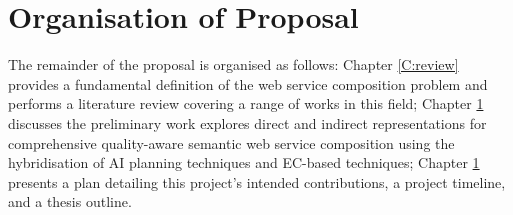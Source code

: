 \section{Organisation of Proposal}The remainder of the proposal is organised as follows: Chapter \ref{C:review} provides a fundamental definition of the web service composition problem and performs a literature review covering a range of works in this field; Chapter \ref{} discusses the preliminary work explores direct and indirect representations for comprehensive quality-aware semantic web service composition using the hybridisation of AI planning techniques and EC-based techniques; Chapter \ref{} presents a plan detailing this project's intended contributions, a project timeline, and a thesis outline.
